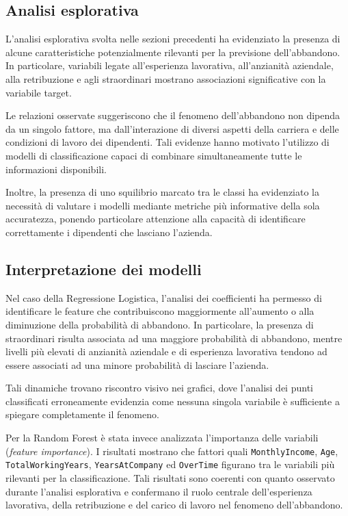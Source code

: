 \documentclass[11pt,a4paper]{article}
\begin{document}
\subsection{Analisi esplorativa}

L'analisi esplorativa svolta nelle sezioni precedenti ha evidenziato la presenza di alcune caratteristiche potenzialmente rilevanti per la previsione dell'abbandono. In particolare, variabili legate all'esperienza lavorativa, all'anzianit\`{a} aziendale, alla retribuzione e agli straordinari mostrano associazioni significative con la variabile target.

Le relazioni osservate suggeriscono che il fenomeno dell'abbandono non dipenda da un singolo fattore, ma dall'interazione di diversi aspetti della carriera e delle condizioni di lavoro dei dipendenti. Tali evidenze hanno motivato l'utilizzo di modelli di classificazione capaci di combinare simultaneamente tutte le informazioni disponibili.

Inoltre, la presenza di uno squilibrio marcato tra le classi ha evidenziato la necessit\`{a} di valutare i modelli mediante metriche pi\`{u} informative della sola accuratezza, ponendo particolare attenzione alla capacit\`{a} di identificare correttamente i dipendenti che lasciano l'azienda.

\subsection{Interpretazione dei modelli}

Nel caso della Regressione Logistica, l'analisi dei coefficienti ha permesso di identificare le feature che contribuiscono maggiormente all'aumento o alla diminuzione della probabilit\`{a} di abbandono. In particolare, la presenza di straordinari risulta associata ad una maggiore probabilit\`{a} di abbandono, mentre livelli pi\`{u} elevati di anzianit\`{a} aziendale e di esperienza lavorativa tendono ad essere associati ad una minore probabilit\`{a} di lasciare l'azienda.

Tali dinamiche trovano riscontro visivo nei grafici, dove l'analisi dei punti classificati erroneamente evidenzia come nessuna singola variabile \`{e} sufficiente a spiegare completamente il fenomeno.

Per la Random Forest \`{e} stata invece analizzata l'importanza delle variabili (\emph{feature importance}). I risultati mostrano che fattori quali \texttt{MonthlyIncome}, \texttt{Age}, \texttt{TotalWorkingYears}, \texttt{YearsAtCompany} ed \texttt{OverTime} figurano tra le variabili pi\`{u} rilevanti per la classificazione. Tali risultati sono coerenti con quanto osservato durante l'analisi esplorativa e confermano il ruolo centrale dell'esperienza lavorativa, della retribuzione e del carico di lavoro nel fenomeno dell'abbandono.
\end{document}
